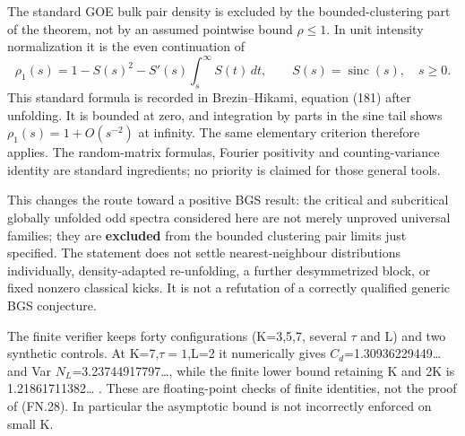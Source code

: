 The standard GOE bulk pair density is excluded by the bounded-clustering part of the theorem, not by an assumed pointwise bound \(\rho\leq1\). In unit intensity normalization it is the even continuation of \[
 \rho_1(s)=1-S(s)^2-S'(s)\int_s^\infty S(t)\,dt,\qquad
 S(s)=\operatorname{sinc}(s),\quad s\geq0.                       \tag{FN.32}
\] This standard formula is recorded in Brezin--Hikami, equation (181) after unfolding. It is bounded at zero, and integration by parts in the sine tail shows \(\rho_1(s)=1+O(s^{-2})\) at infinity. The same elementary criterion therefore applies. The random-matrix formulas, Fourier positivity and counting-variance identity are standard ingredients; no priority is claimed for those general tools.

This changes the route toward a positive BGS result: the critical and subcritical globally unfolded odd spectra considered here are not merely unproved universal families; they are \textbf{excluded} from the bounded clustering pair limits just specified. The statement does not settle nearest-neighbour distributions individually, density-adapted re-unfolding, a further desymmetrized block, or fixed nonzero classical kicks. It is not a refutation of a correctly qualified generic BGS conjecture.

The finite verifier keeps forty configurations (K=3,5,7, several \(\tau\) and L) and two synthetic controls. At K=7,\(\tau=1\),L=2 it numerically gives \(C_{d}\)=1.30936229449\ldots{} and Var \(N_{L}\)=3.23744917797\ldots, while the finite lower bound retaining K and 2K is 1.21861711382\ldots{} . These are floating-point checks of finite identities, not the proof of (FN.28). In particular the asymptotic bound is not incorrectly enforced on small K.
